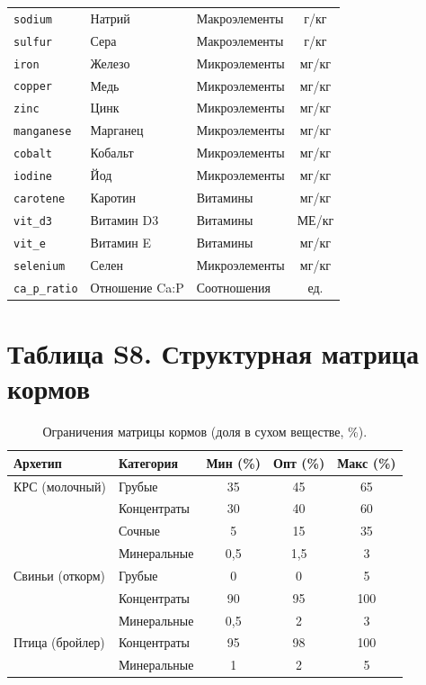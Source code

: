 \documentclass[11pt]{article}
\begin{document}
\begin{longtable}{lllc}
\texttt{sodium} & Натрий & Макроэлементы & г/кг \\
\texttt{sulfur} & Сера & Макроэлементы & г/кг \\
\texttt{iron} & Железо & Микроэлементы & мг/кг \\
\texttt{copper} & Медь & Микроэлементы & мг/кг \\
\texttt{zinc} & Цинк & Микроэлементы & мг/кг \\
\texttt{manganese} & Марганец & Микроэлементы & мг/кг \\
\texttt{cobalt} & Кобальт & Микроэлементы & мг/кг \\
\texttt{iodine} & Йод & Микроэлементы & мг/кг \\
\texttt{carotene} & Каротин & Витамины & мг/кг \\
\texttt{vit\_d3} & Витамин D3 & Витамины & МЕ/кг \\
\texttt{vit\_e} & Витамин E & Витамины & мг/кг \\
\texttt{selenium} & Селен & Микроэлементы & мг/кг \\
\texttt{ca\_p\_ratio} & Отношение Ca:P & Соотношения & ед. \\
\end{longtable}

\section*{Таблица S8. Структурная матрица кормов}
\begin{table}[H]
\centering
\caption{Ограничения матрицы кормов (доля в сухом веществе, \%).}\label{tab:s8_matrix}
\begin{tabular}{llccc}
\toprule
\textbf{Архетип} & \textbf{Категория} & \textbf{Мин (\%)} & \textbf{Опт (\%)} & \textbf{Макс (\%)} \\
\midrule
КРС (молочный) & Грубые & 35 & 45 & 65 \\
& Концентраты & 30 & 40 & 60 \\
& Сочные & 5 & 15 & 35 \\
& Минеральные & 0{,}5 & 1{,}5 & 3 \\
Свиньи (откорм) & Грубые & 0 & 0 & 5 \\
& Концентраты & 90 & 95 & 100 \\
& Минеральные & 0{,}5 & 2 & 3 \\
Птица (бройлер) & Концентраты & 95 & 98 & 100 \\
& Минеральные & 1 & 2 & 5 \\
\bottomrule
\end{tabular}
\end{table}
\end{document}
